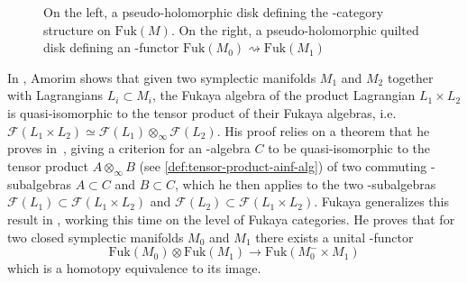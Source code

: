 \documentclass[twoside, 12pt]{amsart}
\theoremstyle{remark}
\begin{document}
\begin{figure}[h]
\begin{subfigure}{0.4\textwidth}

\end{subfigure}

\caption{On the left, a pseudo-holomorphic disk defining the \Ainf -category structure on $\mathrm{Fuk}(M)$. On the right, a pseudo-holomorphic quilted disk defining an \Ainf -functor $\mathrm{Fuk}(M_0)\rightsquigarrow\mathrm{Fuk}(M_1)$} \label{fig:pseudo-hol-disk-bord-lagrang}
\end{figure}

In \cite{amorim-lagrangian}, Amorim shows that given two symplectic manifolds $M_1$ and $M_2$ together with Lagrangians $L_i \subset M_i$, the Fukaya algebra of the product Lagrangian $L_1 \times L_2$ is quasi-isomorphic to the tensor product of their Fukaya algebras, i.e. $\mathcal{F}(L_1 \times L_2) \simeq \mathcal{F}(L_1) \otimes_\infty \mathcal{F}(L_2)$. His proof relies on a theorem that he proves in~\cite{amorim-tensor}, giving a criterion for an \Ainf -algebra $C$ to be quasi-isomorphic to the tensor product $A \otimes_\infty B$ (see \cref{def:tensor-product-ainf-alg}) of two commuting \Ainf -subalgebras $A \subset C$ and $B \subset C$, which he then applies to the two \Ainf -subalgebras $\mathcal{F}(L_1) \subset \mathcal{F}(L_1 \times L_2)$ and $\mathcal{F}(L_2) \subset \mathcal{F}(L_1 \times L_2)$.
Fukaya generalizes this result in \cite{fukaya-unobstructed}, working this time on the level of Fukaya categories. He proves that for two closed symplectic manifolds $M_0$ and $M_1$ there exists a unital \Ainf -functor
\[ \mathrm{Fuk}(M_0) \otimes \mathrm{Fuk}(M_1) \longrightarrow \mathrm{Fuk}(M_0^- \times M_1) \]
which is a homotopy equivalence to its image. 
\end{document}
